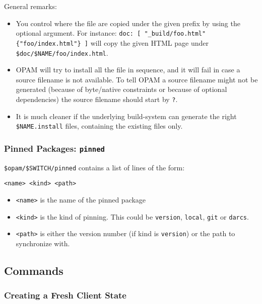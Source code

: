 \documentclass[a4paper,11pt]{article}
\begin{document}
General remarks:
\begin{itemize}

\item You control where the file are copied under the given prefix by
  using the optional argument. For instance:
  \verb+doc: [ "_build/foo.html" {"foo/index.html"} ]+ will copy the
  given HTML page under \verb+$doc/$NAME/foo/index.html+.

\item OPAM will try to install all the file in sequence, and it will
  fail in case a source filename is not available. To tell OPAM a
  source filename might not be generated (because of byte/native
  constraints or because of optional dependencies) the source filename
  should start by \verb+?+.

\item It is much cleaner if the underlying build-system can generate
  the right \verb+$NAME.install+ files, containing the existing files only.

\end{itemize}

\subsubsection{Pinned Packages: {\tt pinned}}

\verb+$opam/$SWITCH/pinned+ contains a list of lines of the form:

\begin{Verbatim}
<name> <kind> <path>
\end{Verbatim}

\begin{itemize}
\item \verb+<name>+ is the name of the pinned package

\item \verb+<kind>+ is the kind of pinning. This could be \verb+version+,
\verb+local+, \verb+git+ or \verb+darcs+.

\item \verb+<path>+ is either the version number (if kind is
  \verb+version+) or the path to synchronize with.
\end{itemize}

\subsection{Commands}

\subsubsection{Creating a Fresh Client State}
\label{opam-init}
\end{document}
